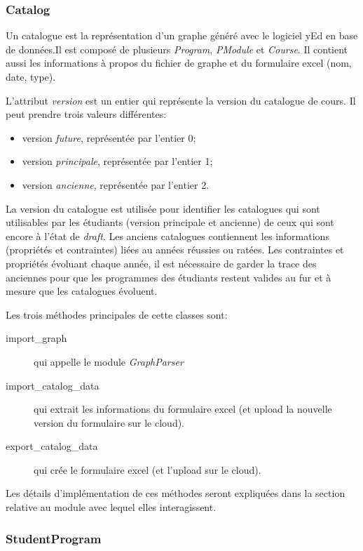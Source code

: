 \subsubsection{Catalog}

Un catalogue est la représentation d'un graphe généré avec le logiciel yEd en base de données.Il est composé de plusieurs \textit{Program}, \textit{PModule} et \textit{Course}. Il contient aussi les informations à propos du fichier de graphe et du formulaire excel (nom, date, type). 

L'attribut \textit{version} est un entier qui représente la version du catalogue de cours. Il peut prendre trois valeurs différentes:

\begin{itemize}
  \item version \textit{future}, représentée par l'entier 0;
  \item version \textit{principale}, représentée par l'entier 1;
  \item version \textit{ancienne}, représentée par l'entier 2.
\end{itemize}

La version du catalogue est utilisée pour identifier les catalogues qui sont utilisables par les étudiants (version principale et ancienne) de ceux qui sont encore à l'état de \textit{draft}. Les anciens catalogues contiennent les informations (propriétés et contraintes) liées au années réussies ou ratées. Les contraintes et propriétés évoluant chaque année, il est nécessaire de garder la trace des anciennes pour que les programmes des étudiants restent valides au fur et à mesure que les catalogues évoluent.

Les trois méthodes principales de cette classes sont:

\begin{description}
  \item[import\_graph] qui appelle le module \textit{GraphParser}
  \item[import\_catalog\_data] qui extrait les informations du formulaire excel (et upload la nouvelle version du formulaire sur le cloud).
  \item[export\_catalog\_data] qui crée le formulaire excel (et l'upload sur le cloud).
\end{description}

Les détails d'implémentation de ces méthodes seront expliquées dans la section relative au module avec lequel elles interagissent. 

\subsubsection{StudentProgram}

